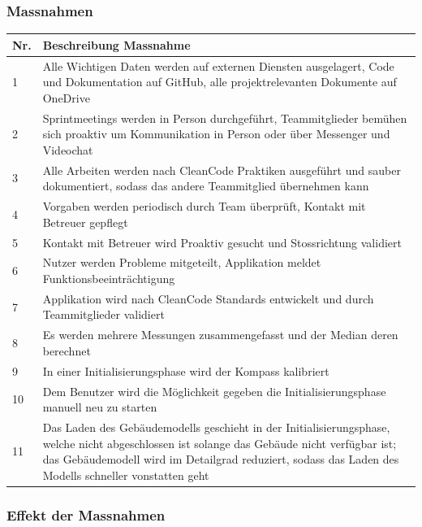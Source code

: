 \documentclass[a4paper]{scrreprt}
\begin{document}
\subsubsection{Massnahmen}

\begin{tabularx}{\textwidth}{|l|X|}
	\hline
	\textbf{Nr.} & \textbf{Beschreibung Massnahme} \\
	\hline
	1 & Alle Wichtigen Daten werden auf externen Diensten ausgelagert, Code und Dokumentation auf GitHub, alle projektrelevanten Dokumente auf OneDrive\\
	\hline
	2 & Sprintmeetings werden in Person durchgeführt, Teammitglieder bemühen sich proaktiv um Kommunikation in Person oder über Messenger und Videochat\\
	\hline
	3 & Alle Arbeiten werden nach CleanCode Praktiken ausgeführt und sauber dokumentiert, sodass das andere Teammitglied übernehmen kann\\
	\hline
	4 & Vorgaben werden periodisch durch Team überprüft, Kontakt mit Betreuer gepflegt\\
	\hline
	5 & Kontakt mit Betreuer wird Proaktiv gesucht und Stossrichtung validiert\\
	\hline
	6 & Nutzer werden Probleme mitgeteilt, Applikation meldet Funktionsbeeinträchtigung\\
	\hline
	7 & Applikation wird nach CleanCode Standards entwickelt und durch Teammitglieder validiert\\
	\hline
	8 & Es werden mehrere Messungen zusammengefasst und der Median deren berechnet\\
	\hline
	9 & In einer Initialisierungsphase wird der Kompass kalibriert\\
	\hline
	10 & Dem Benutzer wird die Möglichkeit gegeben die Initialisierungsphase manuell neu zu starten\\
	\hline
	11 & Das Laden des Gebäudemodells geschieht in der Initialisierungsphase, welche nicht abgeschlossen ist solange das Gebäude nicht verfügbar ist; das Gebäudemodell wird im Detailgrad reduziert, sodass das Laden des Modells schneller vonstatten geht\\
	\hline
\end{tabularx}

\subsubsection{Effekt der Massnahmen}
\end{document}
